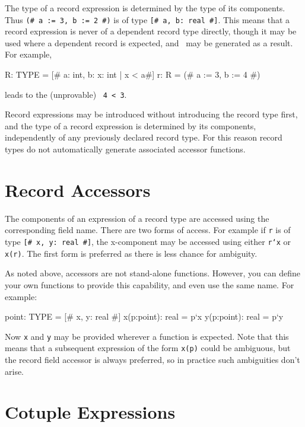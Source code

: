 The type of a record expression is determined by the type of its
components.  Thus \texttt{(\# a := 3, b := 2 \#)} is of type \texttt{[\# a,
b: real \#]}.  This means that a record expression is never of a dependent
record type directly, though it may be used where a dependent record is
expected, and \tccs\ may be generated as a result.  For example,
\begin{pvsex}
  R: TYPE = [# a: int, b: \setb{}x: int | x < a\sete #]
  r: R = (# a := 3, b := 4 #)
\end{pvsex}
%
leads to the (unprovable) \tcc\ \texttt{4 < 3}.

Record expressions may be introduced without introducing the record type
first, and the type of a record expression is determined by its
components, independently of any previously declared record type.  For
this reason record types do not automatically generate associated accessor
functions.

\section{Record Accessors}

The components of an expression of a record type are accessed using the
corresponding field name.  There are two forms of access.  For example if
\texttt{r} is of type \texttt{[\# x, y: real \#]}, the x-component may be
accessed using either \texttt{r`x} or \texttt{x(r)}.  The first form is
preferred as there is less chance for ambiguity.

As noted above, accessors are not stand-alone functions.  However, you can
define your own functions to provide this capability, and even use the
same name.  For example:
\begin{pvsex}
  point: TYPE = [# x, y: real #]
  x(p:point): real = p`x
  y(p:point): real = p`y
\end{pvsex}
Now \texttt{x} and \texttt{y} may be provided wherever a function is
expected.  Note that this means that a subsequent expression of the form
\texttt{x(p)} could be ambiguous, but the record field accessor is always
preferred, so in practice such ambiguities don't arise.

\section{Cotuple Expressions}\label{cotuple-expressions}

